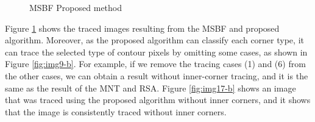 \begin{figure}[htbp]
	\centering

	\caption{ \protect{} MSBF \protect{} Proposed method}
	\label{fig:image16}
\end{figure}


Figure \ref{fig:image16} shows the traced images resulting from the MSBF and proposed algorithm.  Moreover, as the proposed algorithm can classify each corner type, it can trace the selected type of contour pixels by omitting some cases, as shown in Figure \ref{fig:img9-b}. For example, if we remove the tracing cases (1) and (6) from the other cases, we can obtain a result without inner-corner tracing, and it is the same as the result of the MNT and RSA. Figure \ref{fig:img17-b} shows an image that was traced using the proposed algorithm without inner corners, and it shows that the image is consistently traced without inner corners.

